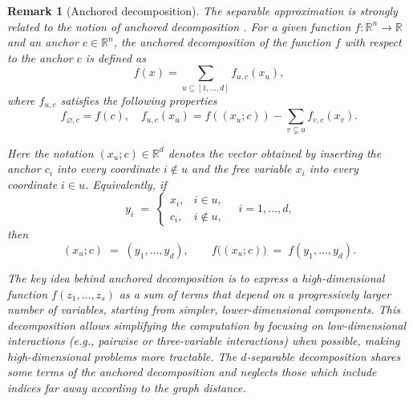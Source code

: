 \documentclass{article}
\newtheorem{remark}{Remark}[section]
\begin{document}
\begin{remark}[Anchored decomposition]
The separable approximation is strongly related to the notion of anchored decomposition \cite{kuo2010decompositions,rieger2024approximability}. For a given function $f: \mathbb{R}^n \rightarrow \mathbb{R}$ and an anchor $c  \in \mathbb{R}^n$, the anchored decomposition of the function $f$ with respect to the anchor $c$ is defined as
\begin{equation}
    f(x) = \sum_{ u \subseteq [1,\ldots,d]}f_{u,c}(x_u),
\end{equation}
where $f_{u,c}$ satisfies the following properties
\begin{equation}
f_{\varnothing,c} = f(c), \quad f_{u,c}(x_u) = f((x_u;c)) - \sum_{v \subsetneq u } f_{v,c} (x_v) .
\label{def_ancho}
\end{equation}

Here the notation \((x_u; c)\in\mathbb{R}^d\) denotes the vector obtained by inserting the anchor \(c_i\) into every coordinate \(i\notin u\) and the free variable \(x_i\) into every coordinate \(i\in u\).  Equivalently, if
\[
    y_i \;=\;
    \begin{cases}
      x_i, & i\in u,\\
      c_i, & i\notin u,
    \end{cases}
    \quad i=1,\dots,d,
\]
then
\[
    (x_u; c) \;=\; (y_1,\dots,y_d),
    \qquad
    f\bigl((x_u; c)\bigr) \;=\; f(y_1,\dots,y_d).
\]

The key idea behind anchored decomposition is to express a high-dimensional function $f(z_1,\ldots,z_s)$
 as a sum of terms that depend on a progressively larger number of variables, starting from simpler, lower-dimensional components. This decomposition allows simplifying the computation by focusing on low-dimensional interactions (e.g., pairwise or three-variable interactions) when possible, making high-dimensional problems more tractable. 
The $d$-separable decomposition shares some terms of the anchored decomposition and neglects those which include indices far away according to the graph distance.


\end{remark}
\end{document}

